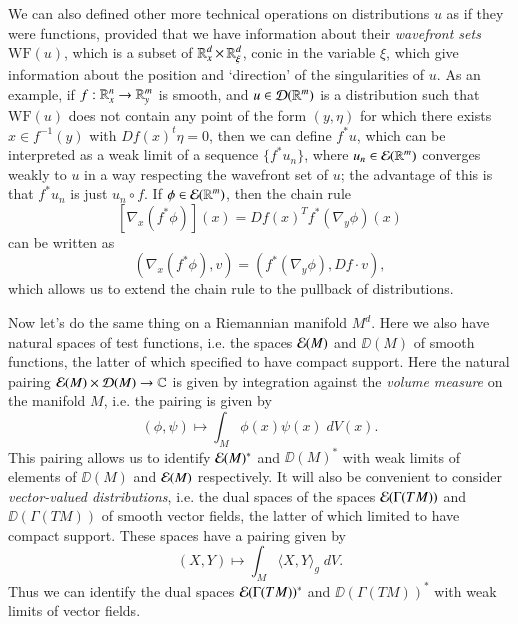 We can also defined other more technical operations on distributions $u$ as if they were functions, provided that we have information about their \emph{wavefront sets} $\text{WF}(u)$, which is a subset of $\operatorname{\mathbb{R}}^d_x \times \operatorname{\mathbb{R}}^d_\xi$, conic in the variable $\xi$, which give information about the position and `direction' of the singularities of $u$. As an example, if $f: \operatorname{\mathbb{R}}^n_x \to \operatorname{\mathbb{R}}^m_y$ is smooth, and $u \in \operatorname{\mathcal{D}}(\operatorname{\mathbb{R}}^m)$ is a distribution such that $\text{WF}(u)$ does not contain any point of the form $(y,\eta)$ for which there exists $x \in f^{-1}(y)$ with $Df(x)^t \eta = 0$, then we can define $f^* u$, which can be interpreted as a weak limit of a sequence $\{ f^* u_n \}$, where $u_n \in \operatorname{\mathcal{E}}(\operatorname{\mathbb{R}}^m)$ converges weakly to $u$ in a way respecting the wavefront set of $u$; the advantage of this is that $f^* u_n$ is just $u_n \circ f$. If $\phi \in \operatorname{\mathcal{E}}(\operatorname{\mathbb{R}}^m)$, then the chain rule
%
\[ [\nabla_x (f^* \phi)](x) = Df(x)^T f^*( \nabla_y \phi )(x) \]
%
can be written as
%
\[ ( \nabla_x (f^* \phi), v) = ( f^*( \nabla_y \phi ), Df \cdot v ),  \]
%
which allows us to extend the chain rule to the pullback of distributions.

Now let's do the same thing on a Riemannian manifold $M^d$. Here we also have natural spaces of test functions, i.e. the spaces $\operatorname{\mathcal{E}}(M)$ and $\DD(M)$ of smooth functions, the latter of which specified to have compact support. Here the natural pairing $\operatorname{\mathcal{E}}(M) \times \operatorname{\mathcal{D}}(M) \to \operatorname{\mathbb{C}}$ is given by integration against the \emph{volume measure} on the manifold $M$, i.e. the pairing is given by
%
\[ (\phi,\psi) \mapsto \int_M \phi(x) \psi(x)\; dV(x). \]
%
This pairing allows us to identify $\operatorname{\mathcal{E}}(M)^*$ and $\DD(M)^*$ with weak limits of elements of $\DD(M)$ and $\operatorname{\mathcal{E}}(M)$ respectively. It will also be convenient to consider \emph{vector-valued distributions}, i.e. the dual spaces of the spaces $\operatorname{\mathcal{E}}(\Gamma(TM))$ and $\DD(\Gamma(TM))$ of smooth vector fields, the latter of which limited to have compact support. These spaces have a pairing given by
%
\[ (X,Y) \mapsto \int_M \langle X, Y \rangle_g\; dV. \]
%
Thus we can identify the dual spaces $\operatorname{\mathcal{E}}(\Gamma(TM))^*$ and $\DD(\Gamma(TM))^*$ with weak limits of vector fields.

